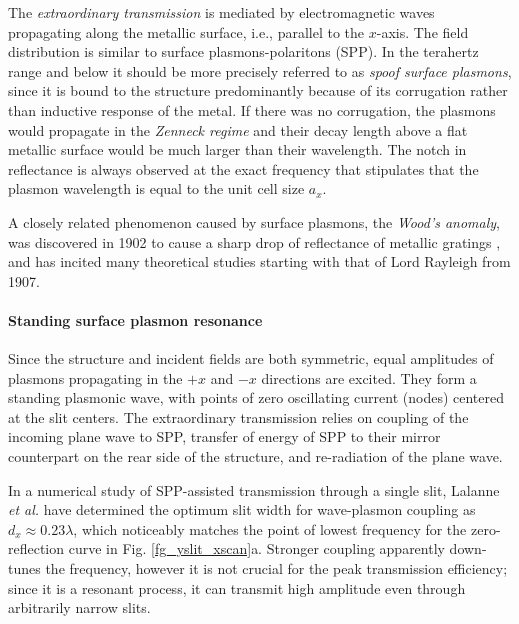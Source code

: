 The \textit{extraordinary transmission} is mediated by electromagnetic waves propagating along the metallic surface, i.e., parallel to the $x$-axis.  %
The field distribution is similar to surface plasmons-polaritons (SPP). In the terahertz range and below it should be more precisely referred to as \textit{spoof surface plasmons}, since it is bound to the structure predominantly because of its corrugation rather than inductive response of the metal. If there was no corrugation, the plasmons would propagate in the \textit{Zenneck regime} \cite{navarro-cia2013terahertz} and their decay length above a flat metallic surface would be much larger than their wavelength. 
The notch in reflectance is always observed at the exact frequency that stipulates that the plasmon wavelength is equal to the unit cell size $a_x$.

A closely related phenomenon  caused by surface plasmons, the \textit{Wood's anomaly}, was discovered in 1902 to cause a sharp drop of reflectance of metallic gratings \cite{wood1902remarkable}, and has incited many theoretical studies starting with that of Lord Rayleigh \cite{rayleigh1907dynamical} from 1907.  %

\paragraph{Standing surface plasmon resonance} %
Since the structure and incident fields are both symmetric, equal amplitudes of plasmons propagating in the $+x$ and $-x$ directions are excited. They form a standing plasmonic wave, with points of zero oscillating current (nodes) centered at the slit centers. The extraordinary transmission relies on coupling of the incoming plane wave to SPP, transfer of energy of SPP to their mirror counterpart on the rear side of the structure, and re-radiation of the plane wave. 

In a numerical study of SPP-assisted transmission through a single slit, Lalanne \textit{et al.} have determined \cite{lalanne2005theory} the optimum slit width for wave-plasmon coupling as $d_x \approx 0.23 \lambda$, which noticeably matches the point of lowest frequency for the zero-reflection curve in Fig. \ref{fg_yslit_xscan}a. Stronger coupling apparently down-tunes the frequency, however it is not crucial for the peak transmission efficiency; since it is a resonant process, it can transmit high amplitude even through arbitrarily narrow slits. 


